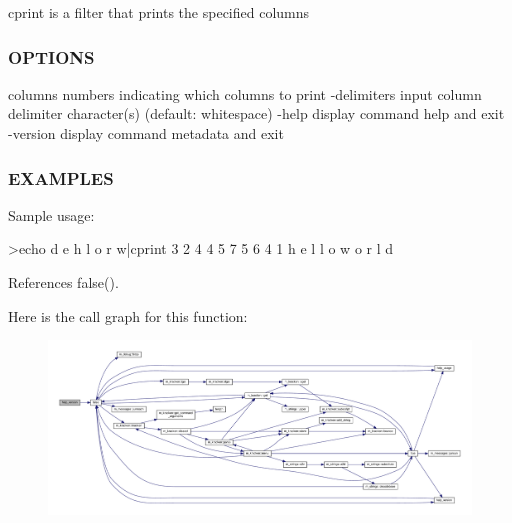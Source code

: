 cprint is a filter that prints the specified columns

\subsubsection*{O\+P\+T\+I\+O\+NS}

columns numbers indicating which columns to print -\/delimiters input column delimiter character(s) (default\+: whitespace) -\/help display command help and exit -\/version display command metadata and exit \subsubsection*{E\+X\+A\+M\+P\+L\+ES}

Sample usage\+: \begin{DoxyVerb}>echo d e h l o r w|cprint 3 2 4 4 5 7 5 6 4 1
h e l l o w o r l d \end{DoxyVerb}
 

References false().

Here is the call graph for this function\+:
\nopagebreak
\begin{figure}[H]
\begin{center}
\leavevmode
\includegraphics[width=350pt]{cprint_8f90_a39c21619b08a3c22f19e2306efd7f766_cgraph}
\end{center}
\end{figure}
